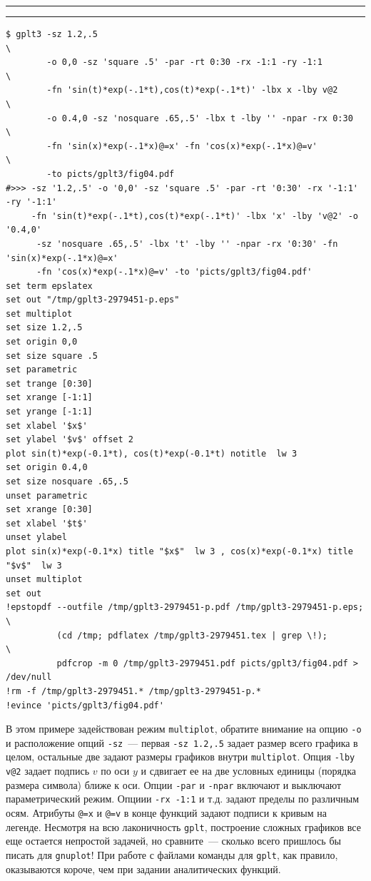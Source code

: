 \documentclass[12pt]{article}
\def\gplt{{\tt gplt}}
\def\gnuplot{{\tt gnuplot}}
\begin{document}
\noindent\rule{.45\textwidth}{1pt}\hfill {}  \hfill\rule{.45\textwidth}{1pt}

{\small
\begin{verbatim}
$ gplt3 -sz 1.2,.5                                                              \
        -o 0,0 -sz 'square .5' -par -rt 0:30 -rx -1:1 -ry -1:1                  \
        -fn 'sin(t)*exp(-.1*t),cos(t)*exp(-.1*t)' -lbx x -lby v@2               \
        -o 0.4,0 -sz 'nosquare .65,.5' -lbx t -lby '' -npar -rx 0:30            \
        -fn 'sin(x)*exp(-.1*x)@=x' -fn 'cos(x)*exp(-.1*x)@=v'                   \
        -to picts/gplt3/fig04.pdf 
#>>> -sz '1.2,.5' -o '0,0' -sz 'square .5' -par -rt '0:30' -rx '-1:1' -ry '-1:1' 
     -fn 'sin(t)*exp(-.1*t),cos(t)*exp(-.1*t)' -lbx 'x' -lby 'v@2' -o '0.4,0' 
      -sz 'nosquare .65,.5' -lbx 't' -lby '' -npar -rx '0:30' -fn 'sin(x)*exp(-.1*x)@=x' 
      -fn 'cos(x)*exp(-.1*x)@=v' -to 'picts/gplt3/fig04.pdf'
set term epslatex 
set out "/tmp/gplt3-2979451-p.eps"
set multiplot
set size 1.2,.5
set origin 0,0
set size square .5
set parametric
set trange [0:30]
set xrange [-1:1]
set yrange [-1:1]
set xlabel '$x$'
set ylabel '$v$' offset 2
plot sin(t)*exp(-0.1*t), cos(t)*exp(-0.1*t) notitle  lw 3 
set origin 0.4,0
set size nosquare .65,.5
unset parametric
set xrange [0:30]
set xlabel '$t$'
unset ylabel
plot sin(x)*exp(-0.1*x) title "$x$"  lw 3 , cos(x)*exp(-0.1*x) title "$v$"  lw 3 
unset multiplot
set out
!epstopdf --outfile /tmp/gplt3-2979451-p.pdf /tmp/gplt3-2979451-p.eps;        \
          (cd /tmp; pdflatex /tmp/gplt3-2979451.tex | grep \!);               \
          pdfcrop -m 0 /tmp/gplt3-2979451.pdf picts/gplt3/fig04.pdf > /dev/null
!rm -f /tmp/gplt3-2979451.* /tmp/gplt3-2979451-p.*
!evince 'picts/gplt3/fig04.pdf'\end{verbatim}
  }

  \begin{center}
  \epsfig{file=picts/gplt3/fig04}
\end{center}
В этом примере задействован режим \verb'multiplot', обратите внимание на опцию \verb'-o' и расположение опций \verb'-sz'~---
первая \verb'-sz 1.2,.5' задает размер всего графика в целом, остальные две задают размеры графиков внутри \verb'multiplot'.
Опция \verb'-lby v@2' задает подпись $v$ по оси $y$ и сдвигает ее на две условных единицы (порядка размера символа) ближе к оси. Опции \verb'-par' и \verb'-npar'
включают и выключают параметрический режим. Опциии \verb'-rx -1:1' и т.д. задают пределы по различным осям. Атрибуты \verb'@=x' и  \verb'@=v' в конце функций
задают подписи к кривым на легенде.
Несмотря на всю лаконичность \gplt, построение сложных графиков все еще остается непростой задачей, но сравните~--- сколько всего пришлось бы писать для \gnuplot!
При работе с файлами команды для \gplt{}, как правило, оказываются короче, чем при задании  аналитических функций.\\
\end{document}
